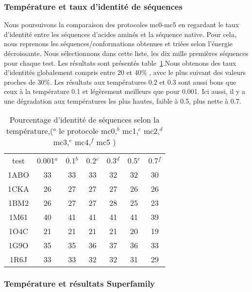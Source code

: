    \subsubsection{Température et taux d'identité de séquences} 
\label{sec:T_et_I}
Nous poursuivons la comparaison des protocoles mc0-mc5 en regardant le taux d'identité entre les séquences d'acides aminés et la séquence native. Pour cela, nous reprenons les séquences/conformations obtenues et triées selon l'énergie décroissante. Nous sélectionnons dans cette liste, les dix mille premières séquences pour chaque test. Les résultats sont présentés table~\ref{tab:ident_mc}.Nous obtenons des taux d'identités globalement compris entre 20 et 40\% , avec le plus suivant des valeurs proches de 30\%. Les résultats aux températures 0.2 et 0.3 sont aussi bons que ceux à la température 0.1 et légèrement meilleurs que pour 0.001. Ici aussi, il y a une dégradation aux températures les plus hautes, faible à 0.5, plus nette à 0.7.

    \begin{table}[!htbp]
      \centering

      \begin{tabular}{ccccccc}
      
        \toprule
         test & 0.001$^a$ & 0.1$^b$ & 0.2$^c$  & 0.3$^d$ & 0.5$^e$ & 0.7$^f$  \\
        \cmidrule{1-7}
        1ABO & 33 & 33 & 33 & 32 & 32  & 30 \\      
        1CKA & 26 & 27 & 27 & 27 & 26  & 26 \\  
        1BM2 & 26 & 27 & 27 & 28 & 25  & 23 \\  
        1M61 & 40 & 41 & 41 & 41 & 41  & 39 \\  
        1O4C & 21 & 21 & 21 & 21 & 20  & 19 \\  
        1G9O & 35 & 35 & 36 & 37 & 36  & 33 \\  
        1R6J & 33 & 33 & 32 & 32 & 31  & 29 \\  
        \bottomrule
        
      \end{tabular}
      

      \caption{Pourcentage d'identité de séquences selon la température,($^a$ le protocole mc0,$^b$ mc1,$^c$  mc2,$^d$ mc3,$^e$ mc4,$^f$ mc5 )}      
      \label{tab:ident_mc}
    \end{table}



   \subsubsection{Température et résultats Superfamily} 

